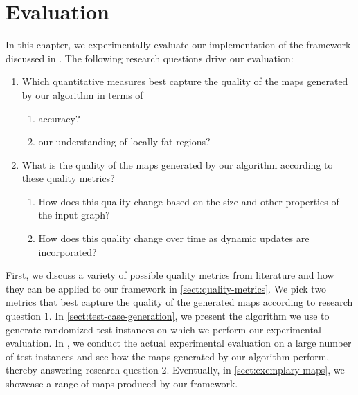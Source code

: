\chapter{Evaluation}
\label{chap:evaluation}

In this chapter, we experimentally evaluate our implementation of the framework discussed in . The following research questions drive our evaluation:

\begin{enumerate}
	\item Which quantitative measures best capture the quality of the maps generated by our algorithm in terms of
	\begin{enumerate}
	\item accuracy?
	\item our understanding of locally fat regions?
	\end{enumerate}
	\item What is the quality of the maps generated by our algorithm according to these quality metrics?
	\begin{enumerate}
	\item How does this quality change based on the size and other properties of the input graph?
	\item How does this quality change over time as dynamic updates are incorporated?
	\end{enumerate}
\end{enumerate}

First, we discuss a variety of possible quality metrics from literature and how they can be applied to our framework in \cref{sect:quality-metrics}.
We pick two metrics that best capture the quality of the generated maps according to research question 1.
In \cref{sect:test-case-generation}, we present the algorithm we use to generate randomized test instances on which we perform our experimental evaluation.
In , we conduct the actual experimental evaluation on a large number of test instances and see how the maps generated by our algorithm perform, thereby answering research question 2.
Eventually, in \cref{sect:exemplary-maps}, we showcase a range of maps produced by our framework.


\clearpage

\clearpage

\clearpage

\clearpage

